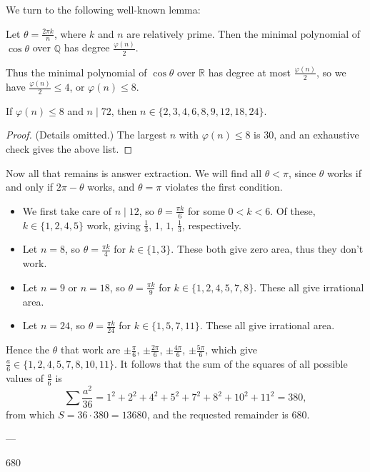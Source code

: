 We turn to the following well-known lemma:
\begin{boxlemma*}
    Let $\theta=\frac{2\pi k}n$, where $k$ and $n$ are relatively prime. Then the minimal polynomial of $\cos\theta$ over $\mathbb Q$ has degree $\frac{\varphi(n)}2$.
\end{boxlemma*}

Thus the minimal polynomial of $\cos\theta$ over $\mathbb R$ has degree at most $\frac{\varphi(n)}2$, so we have $\frac{\varphi(n)}2\le4$, or $\varphi(n)\le8$.
\begin{iclaim*}[Extracting $n$]
    If $\varphi(n)\le8$ and $n\mid 72$, then $n\in\{2,3,4,6,8,9,12,18,24\}$.
\end{iclaim*}
\begin{proof}
    (Details omitted.) The largest $n$ with $\varphi(n)\le8$ is $30$, and an exhaustive check gives the above list.
\end{proof}

Now all that remains is answer extraction. We will find all $\theta<\pi$, since $\theta$ works if and only if $2\pi-\theta$ works, and $\theta=\pi$ violates the first condition.
\begin{itemize}
    \item We first take care of $n\mid12$, so $\theta=\frac{\pi k}6$ for some $0<k<6$. Of these, $k\in\{1,2,4,5\}$ work, giving $\frac13$, $1$, $1$, $\frac13$, respectively.
    \item Let $n=8$, so $\theta=\frac{\pi k}4$ for $k\in\{1,3\}$. These both give zero area, thus they don't work.
    \item Let $n=9$ or $n=18$, so $\theta=\frac{\pi k}9$ for $k\in\{1,2,4,5,7,8\}$. These all give irrational area.
    \item Let $n=24$, so $\theta=\frac{\pi k}{24}$ for $k\in\{1,5,7,11\}$. These all give irrational area.
\end{itemize}
Hence the $\theta$ that work are $\pm\frac\pi6$, $\pm\frac{2\pi}6$, $\pm\frac{4\pi}6$, $\pm\frac{5\pi}6$, which give $\frac a6\in\{1,2,4,5,7,8,10,11\}$. It follows that the sum of the squares of all possible values of $\frac a6$ is \[\sum\frac{a^2}{36}=1^2+2^2+4^2+5^2+7^2+8^2+10^2+11^2=380,\]
from which $S=36\cdot380=13680$, and the requested remainder is $680$.

---

680
